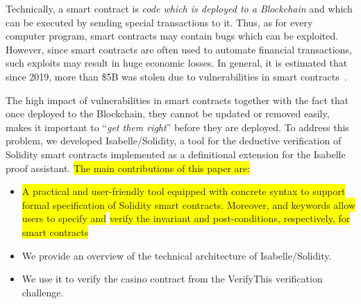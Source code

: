 \documentclass[a4paper,UKenglish,cleveref, autoref, thm-restate]{oasics-v2021}
\begin{document}
Technically, a smart contract is \emph{code which is deployed to a Blockchain} and which can be executed by sending special transactions to it.
Thus, as for every computer program, smart contracts may contain bugs which can be exploited.
However, since smart contracts are often used to automate financial transactions, such exploits may result in huge economic losses.
In general, it is estimated that since 2019, more than \$5B was stolen due to vulnerabilities in smart contracts~\cite{CipherTrace2021}.

The high impact of vulnerabilities in smart contracts together with the fact that once deployed to the Blockchain, they cannot be updated or removed easily, makes it important to ``\emph{get them right}'' before they are deployed.
To address this problem, we developed Isabelle/Solidity, a tool for the deductive verification of Solidity smart contracts implemented as a definitional extension for the Isabelle~\cite{Nipkow2002} proof assistant.
\colorbox{yellow}{The main contributions of this paper are:}
\begin{itemize}
\item \colorbox{yellow}{A practical and user-friendly tool equipped with concrete syntax to support formal specification }
\colorbox{yellow}{of Solidity smart contracts. Moreover, {\color{isarblue}{invariant}} and {\color{isarblue}{verification}} keywords allow users to specify and}
\colorbox{yellow}{verify the invariant and post-conditions, respectively, for smart contracts} 
	\item We provide an overview of the technical architecture of Isabelle/Solidity.
	\item We use it to verify the casino contract from the VerifyThis verification challenge.
\end{itemize}
\end{document}
